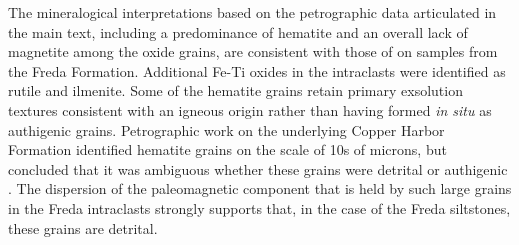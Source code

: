 \documentclass[11pt,letterpaper]{article}
\begin{document}
The mineralogical interpretations based on the petrographic data articulated in the main text, including a predominance of hematite and an overall lack of magnetite among the oxide grains, are consistent with those of \cite{Vincenz1968b} on samples from the Freda Formation. Additional Fe-Ti oxides in the intraclasts were identified as rutile and ilmenite. Some of the hematite grains retain primary exsolution textures consistent with an igneous origin rather than having formed \textit{in situ} as authigenic grains. Petrographic work on the underlying Copper Harbor Formation identified hematite grains on the scale of 10s of microns, but concluded that it was ambiguous whether these grains were detrital or authigenic \citep{Elmore1982a}. The dispersion of the paleomagnetic component that is held by such large grains in the Freda intraclasts strongly supports that, in the case of the Freda siltstones, these grains are detrital.

\newpage


\end{document}
